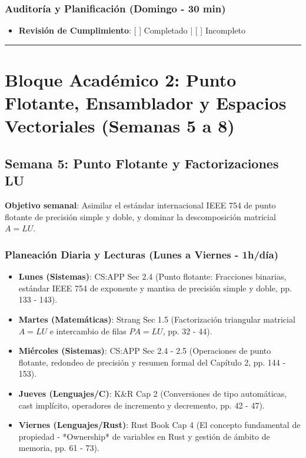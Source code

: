 \documentclass[11pt, a4paper]{article}
\begin{document}
\subsubsection{Auditoría y Planificación (Domingo - 30 min)}
\begin{itemize}
    \item \textbf{Revisión de Cumplimiento}: [ ] Completado | [ ] Incompleto
\end{itemize}

\noindent\rule{\textwidth}{0.4pt}
\newpage

\section{Bloque Académico 2: Punto Flotante, Ensamblador y Espacios Vectoriales (Semanas 5 a 8)}

\subsection{Semana 5: Punto Flotante y Factorizaciones LU}
\textbf{Objetivo semanal}: Asimilar el estándar internacional IEEE 754 de punto flotante de precisión simple y doble, y dominar la descomposición matricial $A = LU$.

\subsubsection{Planeación Diaria y Lecturas (Lunes a Viernes - 1h/día)}
\begin{itemize}
    \item \textbf{Lunes (Sistemas)}: CS:APP Sec 2.4 (Punto flotante: Fracciones binarias, estándar IEEE 754 de exponente y mantisa de precisión simple y doble, pp. 133 - 143).
    \item \textbf{Martes (Matemáticas)}: Strang Sec 1.5 (Factorización triangular matricial $A = LU$ e intercambio de filas $PA = LU$, pp. 32 - 44).
    \item \textbf{Miércoles (Sistemas)}: CS:APP Sec 2.4 - 2.5 (Operaciones de punto flotante, redondeo de precisión y resumen formal del Capítulo 2, pp. 144 - 153).
    \item \textbf{Jueves (Lenguajes/C)}: K\&R Cap 2 (Conversiones de tipo automáticas, cast implícito, operadores de incremento y decremento, pp. 42 - 47).
    \item \textbf{Viernes (Lenguajes/Rust)}: Rust Book Cap 4 (El concepto fundamental de propiedad - *Ownership* de variables en Rust y gestión de ámbito de memoria, pp. 61 - 73).
\end{itemize}
\end{document}
